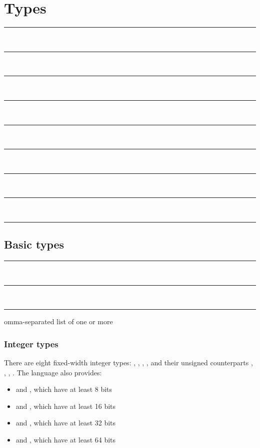 
\chapter{Types}

\begin{grammar}
\rule{type} \\
\rule{type} \\
\rule{type} \\
\rule{type} \\
\rule{type} \\
\rule{type} \\
\rule{type}  \\
\rule{type}  \\
\rule{type}  
\end{grammar}

\section{Basic types}

\begin{grammar}
\rule{basic-type} \\
\rule{basic-type}  \code{<}  \code{>}\\
\rule{generic-argument-list} comma-separated list of one or more 
\end{grammar}

\subsection{Integer types}

There are eight fixed-width integer types: , ,
, , and their unsigned counterparts ,
, , . The language also provides:

\begin{itemize}
\item {} and , which have at least 8 bits
\item {} and , which have at least 16 bits
\item {} and , which have at least 32 bits
\item {} and , which have at least 64 bits
\end{itemize}

